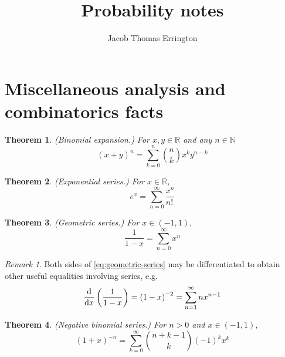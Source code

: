 \documentclass[11pt,letterpaper]{article}
\author{Jacob Thomas Errington}
\title{Probability notes}
\date{}
\newtheorem{thm}{Theorem}
\theoremstyle{definition}
\theoremstyle{remark}
\newtheorem{rem}{Remark}[section]
\newcommand{\parens}[1]{\left(#1\right)}
\newcommand{\fact}{!\,}
\newcommand{\infsum}{\sum^\infty}
\renewcommand{\d}[2][]{%
    \ensuremath
    \frac{\mathrm{d}#1}{\mathrm{d}#2}
}
\newcommand{\R}{\mathbb{R}}
\newcommand{\N}{\mathbb{N}}
\begin{document}
\maketitle

\section{Miscellaneous analysis and combinatorics facts}

\begin{thm}{(Binomial expansion.)}
    \label{thm:binomial-expansion}
    For $x, y \in \R$ and any $n \in \N$
    \begin{equation}
        \label{eq:binomial-expansion}
        (x + y)^n = \sum_{k=0}^n {
            {n \choose k} x^k y^{n -k}
        }
    \end{equation}
\end{thm}

\begin{thm}{(Exponential series.)}
    \label{thm:exponential-series}
    For $x \in \R$,
    \begin{equation}
        \label{eq:series-ex}
        e^x = \infsum_{n=0} {
            \frac{x^n}{n\fact}
        }
    \end{equation}
\end{thm}

\begin{thm}{(Geometric series.)}
    \label{thm:geometric-series}
    For $x \in (-1, 1)$,
    \begin{equation}
        \label{eq:geometric-series}
        \frac{1}{1 - x} = \infsum_{n=0} { x^n }
    \end{equation}
\end{thm}

\begin{rem}
    \label{rem:differentiate-geometric-series}
    Both sides of \eqref{eq:geometric-series} may be differentiated to obtain
    other useful equalities involving series, e.g.
    \begin{equation*}
        \d{x}\parens{ \frac{1}{1-x} }
        =
        \parens{1-x}^{-2}
        =
        \infsum_{n=1} { n x^{n-1} }
    \end{equation*}
\end{rem}

\begin{thm}{(Negative binomial series.)}
    \label{thm:negative-binomial-series}
    For $n > 0$ and $x \in (-1, 1)$,
    \begin{equation}
        \label{eq:negative-binomial-series}
        (1+x)^{-n} = \infsum_{k=0} {
            {{n + k - 1} \choose k} (-1)^k x^k
        }
    \end{equation}
\end{thm}
\end{document}
